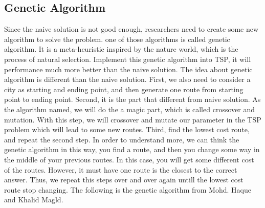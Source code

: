 \documentclass[a4paper,man,natbib]{apa6}
\begin{document}
\subsection{Genetic Algorithm}
Since the naive solution is not good enough, researchers need to create some new algorithm to solve the problem. one of those algorithms is called genetic algorithm. It is a meta-heuristic inspired by the nature world, which is the process of natural selection. Implement this genetic algorithm into TSP, it will performance much more better than the naive solution. The idea about genetic algorithm is different than the naive solution. First, we also need to consider a city as starting and ending point, and then generate one route from starting point to ending point. Second, it is the part that different from naive solution. As the algorithm named, we will do the a magic part, which is called crossover and mutation. With this step, we will crossover and mutate our parameter in the TSP problem which will lead to some new routes. Third, find the lowest cost route, and repeat the second step. In order to understand more, we can think the genetic algorithm in this way, you find a route, and then you change some way in the middle of your previous routes. In this case, you will get some different cost of the routes. However, it must have one route is the closest to the correct answer. Thus, we repeat this steps over and over again untill the lowest cost route stop changing. The following is the genetic algorithm from Mohd. Haque and Khalid Magld.
\end{document}
